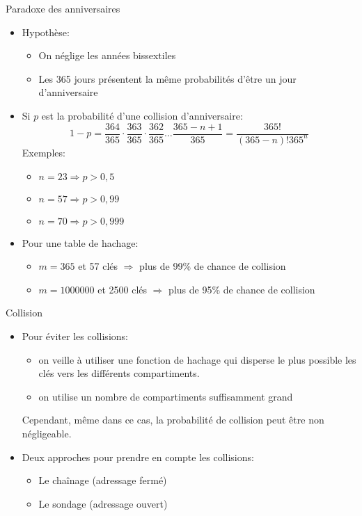 \begin{frame}{Paradoxe des anniversaires}

\begin{itemize}
\item Hypothèse:
\begin{itemize}
\item On néglige les années bissextiles
\item Les 365 jours présentent la même probabilités d'être un jour d'anniversaire
\end{itemize}
\item Si $p$ est la probabilité d'une collision d'anniversaire:
$$1-p = \frac{364}{365} \cdot \frac{363}{365} \cdot \frac{362}{365} \ldots \frac{365-n+1}{365} = \frac{365!}{(365-n)! 365^n}$$
Exemples:
\begin{itemize}
\item $n=23 \Rightarrow p>0,5$
\item $n=57 \Rightarrow p>0,99$
\item $n=70 \Rightarrow p>0,999$
\end{itemize}
\bigskip

\item Pour une table de hachage:
\begin{itemize}
\item $m=365$ et 57 clés $\Rightarrow$ plus de 99\% de chance de collision
\item $m=1000000$ et 2500 clés $\Rightarrow$ plus de 95\% de chance de collision
\end{itemize}
\end{itemize}
\end{frame}

\begin{frame}{Collision}

\begin{itemize}
\item Pour éviter les collisions:
\begin{itemize}
\item on veille à utiliser une fonction de hachage qui disperse le
  plus possible les clés vers les différents compartiments.
\item on utilise un nombre de compartiments suffisamment grand
\end{itemize}
Cependant, même dans ce cas, la probabilité de collision peut
  être non négligeable.

\bigskip

\item Deux approches pour prendre en compte les collisions:
\begin{itemize}
\item Le chaînage (adressage fermé)
\item Le sondage (adressage ouvert)
\end{itemize}
\end{itemize}


\end{frame}


